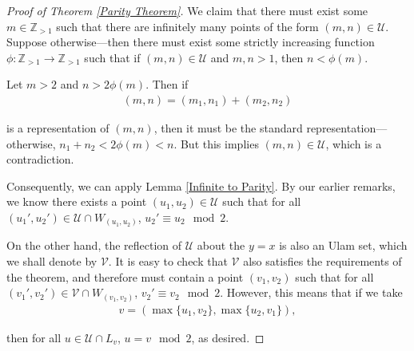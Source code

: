 \documentclass{amsart}
\newcommand{\ZZ}{\mathbb{Z}}
\newcommand{\U}{\mathcal{U}}
\theoremstyle{theorem}
\theoremstyle{definition}
\begin{document}
\begin{proof}[Proof of Theorem \ref{Parity Theorem}]
We claim that there must exist some $m \in \ZZ_{> 1}$ such that there are infinitely many points of the form $(m,n) \in \U$. Suppose otherwise---then there must exist some strictly increasing function $\phi: \ZZ_{> 1} \rightarrow \ZZ_{> 1}$ such that if $(m,n) \in \U$ and $m,n > 1$, then $n < \phi(m)$.

Let $m > 2$ and $n > 2 \phi(m)$. Then if
	\begin{align*}
    (m,n) = (m_1, n_1) + (m_2, n_2)
    \end{align*}

\noindent is a representation of $(m,n)$, then it must be the standard representation---otherwise, $n_1 + n_2 < 2\phi(m) < n$. But this implies $(m,n) \in \U$, which is a contradiction.

Consequently, we can apply Lemma \ref{Infinite to Parity}. By our earlier remarks, we know there exists a point $(u_1, u_2) \in \U$ such that for all $(u_1',u_2') \in \U \cap W_{(u_1, u_2)}$, $u_2' \equiv u_2 \mod 2$.

On the other hand, the reflection of $\U$ about the $y = x$ is also an Ulam set, which we shall denote by $\mathcal{V}$. It is easy to check that $\mathcal{V}$ also satisfies the requirements of the theorem, and therefore must contain a point $(v_1, v_2)$ such that for all $(v_1', v_2') \in \mathcal{V} \cap W_{(v_1, v_2)}$, $v_2' \equiv v_2 \mod 2$. However, this means that if we take
	\begin{align*}
    v = \left(\max\{u_1, v_2\}, \max\{u_2, v_1\}\right),
    \end{align*}
    
\noindent then for all $u \in \U \cap L_v$, $u = v \mod 2$, as desired.
\end{proof}



\end{document}
